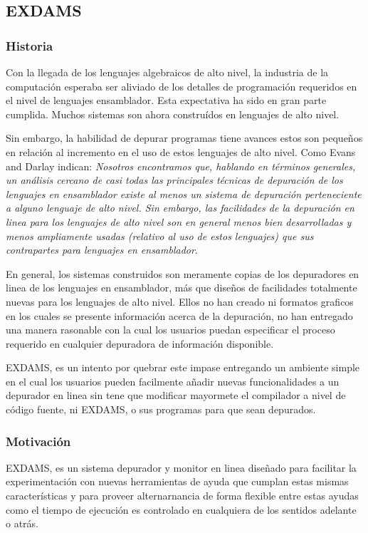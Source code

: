 \documentclass[12pt,a4paper]{report}
\begin{document}
		\subsection{EXDAMS}
			\subsubsection{Historia}

Con la llegada de los lenguajes algebraicos de alto nivel, la industria de la computación esperaba ser aliviado de los detalles de programación requeridos en el nivel de lenguajes ensamblador.  Esta expectativa ha sido en gran parte cumplida.  Muchos sistemas son ahora construídos en lenguajes de alto nivel.

Sin embargo, la habilidad de depurar programas tiene avances estos son pequeños en relación al incremento en el uso de estos lenguajes de alto nivel.  Como Evans and Darlay indican:
\textit{ Nosotros encontramos que, hablando en términos generales, un análisis cercano de casi todas las principales técnicas de depuración de los lenguajes en ensamblador existe al menos un sistema de depuración perteneciente a alguno lenguaje de alto nivel.  Sin embargo, las facilidades de la depuración en linea para los lenguajes de alto nivel son en general menos bien desarrolladas y menos ampliamente usadas (relativo al uso de estos lenguajes) que sus contrapartes para lenguajes en ensamblador}.

En general, los sistemas construidos son meramente copias de los depuradores en linea de los lenguajes en ensamblador, más que diseños de facilidades totalmente nuevas para los lenguajes de alto nivel.  Ellos no han creado ni formatos graficos en los cuales se presente información acerca de la depuración, no han entregado una manera rasonable con la cual los usuarios puedan especificar el proceso requerido en cualquier depuradora de información disponible.

EXDAMS, es un intento por quebrar este impase entregando un ambiente simple en el cual los usuarios pueden facilmente añadir nuevas funcionalidades a un depurador en linea sin tene que modificar mayormete el compilador a nivel de código fuente, ni EXDAMS, o sus programas para que sean depurados.


			\subsubsection{Motivación}

EXDAMS, es un sistema depurador y monitor en linea diseñado para facilitar la experimentación con nuevas herramientas de ayuda que cumplan estas mismas características y para proveer alternarnancia de forma flexible entre estas ayudas como el tiempo de ejecución es controlado en cualquiera de los sentidos adelante o atrás.
\end{document}
